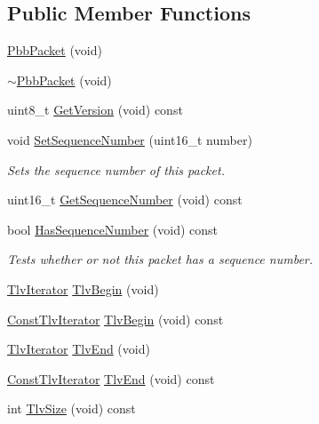 \subsection*{Public Member Functions}
\begin{DoxyCompactItemize}
\item 
\hyperlink{classns3_1_1PbbPacket_ab33468bbfa4bbd156d4f9257afb1e7a8}{Pbb\+Packet} (void)
\item 
\hyperlink{classns3_1_1PbbPacket_aea80aa94dc6d346658d32fba01205a9c}{$\sim$\+Pbb\+Packet} (void)
\item 
uint8\+\_\+t \hyperlink{classns3_1_1PbbPacket_a15bee7d20950c0243cced40650f313a3}{Get\+Version} (void) const 
\item 
void \hyperlink{classns3_1_1PbbPacket_a7d6a1602be86109760d0f26ff9bbbb8e}{Set\+Sequence\+Number} (uint16\+\_\+t number)
\begin{DoxyCompactList}\small\item\em Sets the sequence number of this packet. \end{DoxyCompactList}\item 
uint16\+\_\+t \hyperlink{classns3_1_1PbbPacket_ae512a98f95a9115e29d9040f29c444e2}{Get\+Sequence\+Number} (void) const 
\item 
bool \hyperlink{classns3_1_1PbbPacket_a1dbfa2209a94926f31f1f943553e148f}{Has\+Sequence\+Number} (void) const 
\begin{DoxyCompactList}\small\item\em Tests whether or not this packet has a sequence number. \end{DoxyCompactList}\item 
\hyperlink{classns3_1_1PbbPacket_aed5b643d3a1c201bd4071eed0e2066d5}{Tlv\+Iterator} \hyperlink{classns3_1_1PbbPacket_a23fe950b8c23dbf50021ea6f901484e3}{Tlv\+Begin} (void)
\item 
\hyperlink{classns3_1_1PbbPacket_af4ade92b0fd19f31c07ad2cd0303ed21}{Const\+Tlv\+Iterator} \hyperlink{classns3_1_1PbbPacket_a132681ec5f54a805aab689a2ea75b840}{Tlv\+Begin} (void) const 
\item 
\hyperlink{classns3_1_1PbbPacket_aed5b643d3a1c201bd4071eed0e2066d5}{Tlv\+Iterator} \hyperlink{classns3_1_1PbbPacket_a53808445dc0e1ae038820f1dfe074df0}{Tlv\+End} (void)
\item 
\hyperlink{classns3_1_1PbbPacket_af4ade92b0fd19f31c07ad2cd0303ed21}{Const\+Tlv\+Iterator} \hyperlink{classns3_1_1PbbPacket_ae78a7019ffec61d9345049a55b762345}{Tlv\+End} (void) const 
\item 
int \hyperlink{classns3_1_1PbbPacket_a838a0e6822c1f45abe1bf30438cfe67f}{Tlv\+Size} (void) const 

\end{DoxyCompactItemize}
